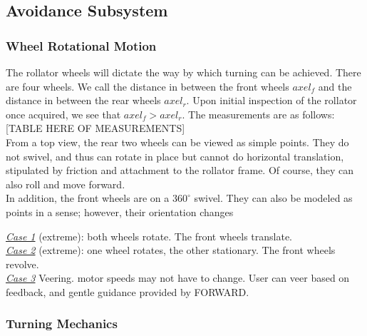 \subsection{Avoidance Subsystem}

\subsubsection{Wheel Rotational Motion}
\noindent The rollator wheels will dictate the way by which turning can be achieved. There are four wheels. We call the distance in between the front wheels $axel_f$ and the distance in between the rear wheels $axel_r$. Upon initial inspection of the rollator once acquired, we see that $axel_f > axel_r$. The measurements are as follows:\\

[TABLE HERE OF MEASUREMENTS]\\

\noindent From a top view, the rear two wheels can be viewed as simple points. They do not swivel, and thus can rotate in place but cannot do horizontal translation, stipulated by friction and attachment to the rollator frame. Of course, they can also roll and move forward.\\

\noindent In addition, the front wheels are on a $360^{\circ}$ swivel. They can also be modeled as points in a sense; however, their orientation changes

\noindent \underline{\textit{Case 1}} (extreme): both wheels rotate. The front wheels translate.\\

\noindent \underline{\textit{Case 2}} (extreme): one wheel rotates, the other stationary. The front wheels revolve.\\

\noindent \underline{\textit{Case 3}} Veering. motor speeds may not have to change. User can veer based on feedback, and gentle guidance provided by FORWARD.\\

\subsubsection{Turning Mechanics}

